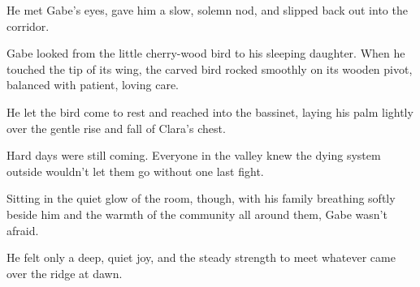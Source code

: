 He met Gabe’s eyes, gave him a slow, solemn nod, and slipped back out into the corridor. 

Gabe looked from the little cherry-wood bird to his sleeping daughter. When he touched the tip of its wing, the carved bird rocked smoothly on its wooden pivot, balanced with patient, loving care. 

He let the bird come to rest and reached into the bassinet, laying his palm lightly over the gentle rise and fall of Clara's chest. 

Hard days were still coming. Everyone in the valley knew the dying system outside wouldn't let them go without one last fight. 

Sitting in the quiet glow of the room, though, with his family breathing softly beside him and the warmth of the community all around them, Gabe wasn't afraid. 

He felt only a deep, quiet joy, and the steady strength to meet whatever came over the ridge at dawn. 
